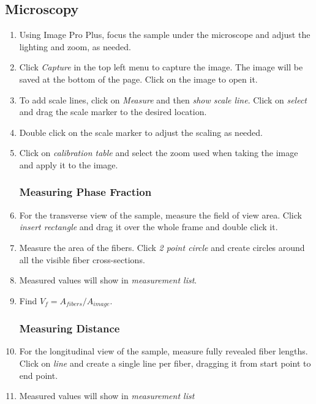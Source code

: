 \documentclass[11pt]{article}
\begin{document}
\subsection{Microscopy}
\begin{enumerate}
\item Using Image Pro Plus, focus the sample under the microscope and adjust the lighting and zoom, as needed.

\item Click \textit{Capture} in the top left menu to capture the image. The image will be saved at the bottom of the page. Click on the image to open it.

\item To add scale lines, click on \textit{Measure} and then \textit{show scale line}. Click on \textit{select} and drag the scale marker to the desired location.

\item Double click on the scale marker to adjust the scaling as needed.

\item Click on \textit{calibration table} and select the zoom used when taking the image and apply it to the image.

\subsubsection{Measuring Phase Fraction}

\item For the transverse view of the sample, measure the field of view area. Click \textit{insert rectangle} and drag it over the whole frame and double click it.

\item Measure the area of the fibers. Click \textit{2 point circle} and create circles around all the visible fiber cross-sections.

\item Measured values will show in \textit{measurement list}.

\item Find \(V_f = A_{fibers}/A_{image}\).

\subsubsection{Measuring Distance}

\item For the longitudinal view of the sample, measure fully revealed fiber lengths. Click on \textit{line} and create a single line per fiber, dragging it from start point to end point.

\item Measured values will show in \textit{measurement list}

\end{enumerate}
\end{document}
